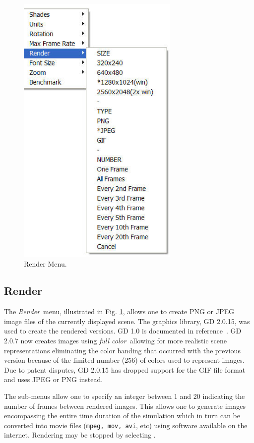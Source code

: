 \documentclass[11pt,twoside]{book}
\begin{document}
\begin{figure}[\figoptions]
\begin{center}
\includegraphics[width=3.0764in]{FIGURES/menu_render2}
\caption{Render Menu.} \label{fig_rendermenu}
\end{center}
\end{figure}

\subsection{Render}
The {\em Render}\ menu, illustrated in Fig.
\ref{fig_rendermenu}, allows one to create PNG or JPEG image files
of the currently displayed scene. The graphics library, GD 2.0.15,
was used to create the rendered versions.  GD 1.0 is documented in
reference~\cite[Appendix 4]{BOUTELL}.  GD 2.0.7 now creates images
using {\em full color}\ allowing for more realistic scene
representations eliminating the color banding that occurred with
the previous version because of the limited number (256) of colors
used to represent images. Due to patent disputes, GD 2.0.15 has
dropped support for the GIF file format and uses JPEG or PNG
instead.

The  sub-menus allow one to specify an
integer between 1 and 20 indicating the number of frames
between rendered images. This allows one to generate images
encompassing the entire time duration of the simulation
which in turn can be converted into movie files ({\tt mpeg,
mov, avi}, etc) using software available on the internet.
Rendering may be stopped by selecting .
\end{document}
